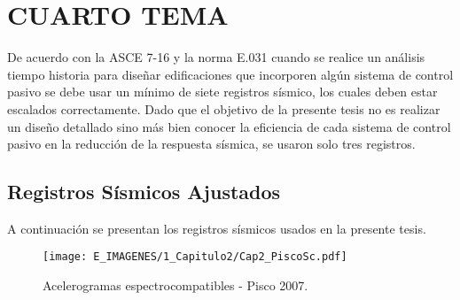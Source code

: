 \section{CUARTO TEMA}

De acuerdo con la ASCE 7-16 y la norma E.031 cuando se realice un análisis tiempo historia para diseñar edificaciones que incorporen algún sistema de control pasivo se debe usar un mínimo de siete registros sísmico, los cuales deben estar escalados correctamente. Dado que el objetivo de la presente tesis no es realizar un diseño detallado sino más bien conocer la eficiencia de cada sistema de control pasivo en la reducción de la respuesta sísmica, se usaron solo tres registros.

	\subsection{Registros Sísmicos Ajustados}
	
A continuación se presentan los registros sísmicos usados en la presente tesis.
			
	\begin{figure}[h!]
	\centering
	\texttt{[image: E\_IMAGENES/1\_Capitulo2/Cap2\_PiscoSc.pdf]}
	\vspace{-8 mm}
	\caption[Acelerogramas espectrocompatibles - Pisco 2007]{\centering\footnotesize Acelerogramas espectrocompatibles - Pisco 2007.}
	\label{Cap2_Figura15}
	\end{figure}	
			

